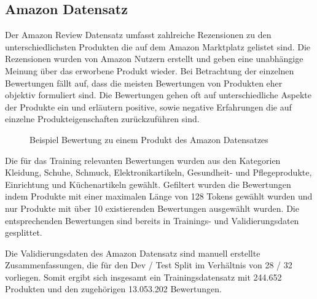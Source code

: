 \subsection{Amazon Datensatz}
Der Amazon Review Datensatz \citep{brazinskas2020-unsupervised} umfasst zahlreiche Rezensionen zu den unterschiedlichsten Produkten die auf dem Amazon Marktplatz gelistet sind.
Die Rezensionen wurden von Amazon Nutzern erstellt und geben eine unabhängige Meinung über das erworbene Produkt wieder.
Bei Betrachtung der einzelnen Bewertungen fällt auf, dass die meisten Bewertungen von Produkten eher objektiv formuliert sind. 
Die Bewertungen gehen oft auf unterschiedliche Aspekte der Produkte ein und erläutern positive, sowie negative Erfahrungen die auf einzelne Produkteigenschaften zurückzuführen sind.

\setlength{\fboxsep}{1em}

\begin{figure}[!h]
    \centering
    \scriptsize
    \caption{Beispiel Bewertung zu einem Produkt des Amazon Datensatzes}
\end{figure}

Die für das Training relevanten Bewertungen wurden aus den Kategorien Kleidung, Schuhe, Schmuck, Elektronikartikeln, Gesundheit- und Pflegeprodukte, Einrichtung und Küchenartikeln gewählt.
Gefiltert wurden die Bewertungen indem Produkte mit einer maximalen Länge von 128 Tokens gewählt wurden und nur Produkte mit über 10 existierenden Bewertungen ausgewählt wurden. 
Die entsprechenden Bewertungen sind bereits in Trainings- und Validierungsdaten gesplittet.

Die Validierungsdaten des Amazon Datensatz sind manuell erstellte Zusammenfassungen, die für den Dev / Test Split im Verhältnis von 28 / 32 vorliegen.
Somit ergibt sich insgesamt ein Trainingsdatensatz mit 244.652 Produkten und den zugehörigen 13.053.202 Bewertungen.

